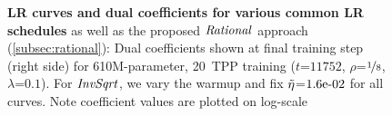 \begin{figure}
{\begin{minipage}{\textwidth}
      \subcaption{$\invsqrt$}
      \label{fig:more_ema_lrs:invsqrt}
    \end{minipage}
  }
  \mbox{}
  \vspace{2mm}
  \mbox{}
   \mbox{}
  \vspace{2mm}
  \mbox{}
  \caption{\textbf{LR curves and dual coefficients for various common
      LR schedules} as well as the proposed $\mbox{\emph{Rational}}$ approach
    (\cref{subsec:rational}): Dual coefficients shown at final
    training step (right side) for 610M-parameter, 20~TPP training
    ($t$=$11752$, $\rho$=$\nicefrac{1}{8}$, $\lambda$=$0.1$).  For
    $\invsqrt$, we vary the warmup and fix $\tilde{\eta}$=$1.6\mbox{e-}02$ for all
    curves.  Note coefficient values are plotted on
    log-scale\label{fig:more_ema_lrs}}
\end{figure}
